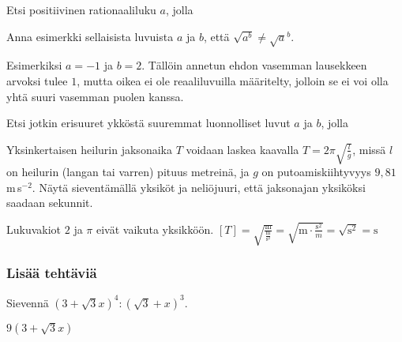 \begin{tehtavasivu}
\begin{tehtava} Etsi positiivinen rationaaliluku $a$, jolla
	\begin{vastaus}
	\end{vastaus}
\end{tehtava}

\begin{tehtava}
Anna esimerkki sellaisista luvuista $a$ ja $b$, että $\sqrt{a^b}\neq {\sqrt{a}}^b$.
	\begin{vastaus}
Esimerkiksi $a=-1$ ja $b=2$. Tällöin annetun ehdon vasemman lausekkeen arvoksi tulee $1$, mutta oikea ei ole reaaliluvuilla määritelty, jolloin se ei voi olla yhtä suuri vasemman puolen kanssa.
	\end{vastaus}
\end{tehtava}

\begin{tehtava} Etsi jotkin erisuuret ykköstä suuremmat luonnolliset luvut $a$ ja $b$, jolla
	\begin{vastaus}
	\end{vastaus}
\end{tehtava}

\begin{tehtava}
Yksinkertaisen heilurin jaksonaika $T$ voidaan laskea kaavalla $T=2\pi\sqrt{\frac{l}{g}}$, missä $l$ on heilurin (langan tai varren) pituus metreinä, ja $g$ on putoamiskiihtyvyys $9,81\,$m\,s$^{-2}$. Näytä sieventämällä yksiköt ja neliöjuuri, että jaksonajan yksiköksi saadaan sekunnit.
	\begin{vastaus}
	Lukuvakiot $2$ ja $\pi$ eivät vaikuta yksikköön. $[T]=\sqrt{\frac{\text{m}}{\frac{\text{m}}{\text{s}^2}}}=\sqrt{\text{m}\cdot \frac{\text{s}^2}{m}}=\sqrt{\text{s}^2}=\text{s}$
	\end{vastaus} 
\end{tehtava}

\subsubsection*{Lisää tehtäviä}

\begin{tehtava}
Sievennä $(3+\sqrt{3}x)^4:(\sqrt{3}+x)^3$.
	\begin{vastaus}
$9(3 + \sqrt{3}x)$
	\end{vastaus}
\end{tehtava}


\end{tehtavasivu}
